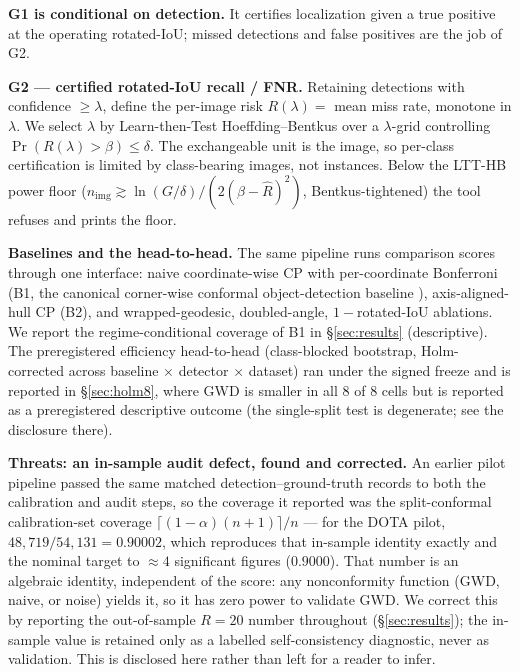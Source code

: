 \documentclass[11pt]{article}
\begin{document}
\textbf{G1 is conditional on detection.} It certifies localization given a true positive at the
operating rotated-IoU; missed detections and false positives are the job of G2.

\textbf{G2 --- certified rotated-IoU recall / FNR.} Retaining detections with confidence $\ge\lambda$, define
the per-image risk $R(\lambda)=$ mean miss rate, monotone in $\lambda$. We select $\lambda$ by Learn-then-Test
Hoeffding--Bentkus over a $\lambda$-grid controlling $\Pr(R(\lambda)>\beta)\le\delta$. The exchangeable unit is
the image, so per-class certification is limited by class-bearing images, not instances. Below the
LTT-HB power floor ($n_{\mathrm{img}}\gtrsim\ln(G/\delta)/(2(\beta-\hat R)^2)$, Bentkus-tightened) the tool
refuses and prints the floor.

\textbf{Baselines and the head-to-head.} The same pipeline runs comparison scores through one interface: naive
coordinate-wise CP with per-coordinate Bonferroni (B1, the canonical corner-wise conformal
object-detection baseline \citep{degrancey2022}), axis-aligned-hull CP (B2), and wrapped-geodesic,
doubled-angle, $1-$rotated-IoU ablations. We report the regime-conditional coverage of B1 in
\S\ref{sec:results} (descriptive). The preregistered efficiency head-to-head (class-blocked bootstrap,
Holm-corrected across baseline $\times$ detector $\times$ dataset) ran under the signed freeze and is reported
in \S\ref{sec:holm8}, where GWD is smaller in all $8$ of $8$ cells but is reported as a preregistered
descriptive outcome (the single-split test is degenerate; see the disclosure there).

\textbf{Threats: an in-sample audit defect, found and corrected.} An earlier pilot pipeline
passed the same matched detection--ground-truth records to both the calibration and audit steps, so
the coverage it reported was the split-conformal calibration-set coverage
$\lceil(1-\alpha)(n+1)\rceil/n$ --- for the DOTA pilot, $48{,}719/54{,}131=0.90002$, which reproduces that
in-sample identity exactly and the nominal target to $\approx4$ significant figures ($0.9000$). That number is
an algebraic identity, independent of the score: any nonconformity
function (GWD, naive, or noise) yields it, so it has zero power to validate GWD. We correct this by
reporting the out-of-sample $R{=}20$ number throughout (\S\ref{sec:results}); the in-sample value is retained
only as a labelled self-consistency diagnostic, never as validation. This is disclosed here rather than left
for a reader to infer.
\end{document}
